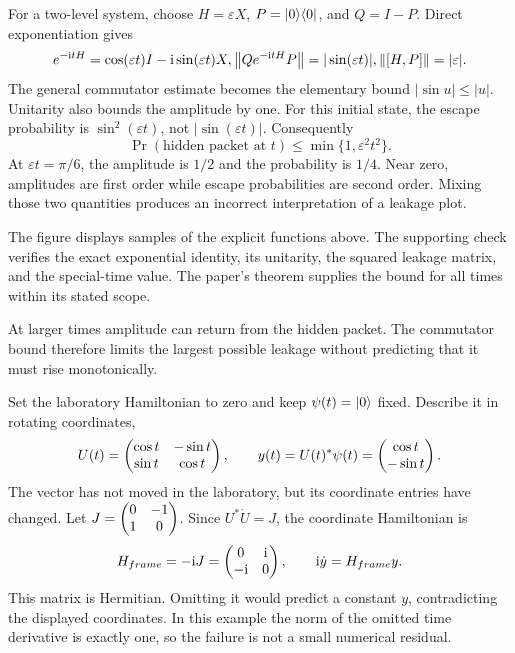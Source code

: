 For a two-level system, choose $H=\varepsilon X$, $P=\lvert 0\rangle\langle 0\rvert$, and $Q=I-P$. Direct exponentiation gives
\[
e^{-\ii tH}=\cos(\varepsilon t)I-\ii\sin(\varepsilon t)X,
\quad
\norm{Qe^{-\ii tH}P}=|\sin(\varepsilon t)|,
\quad\norm{[H,P]}=|\varepsilon|.
\]
The general commutator estimate becomes the elementary bound $|\sin u|\le |u|$. Unitarity also bounds the amplitude by one.
For this initial state, the escape probability is $\sin^2(\varepsilon t)$, not $|\sin(\varepsilon t)|$. Consequently
\[
\Pr(\text{hidden packet at }t)\le\min\{1,\varepsilon^2t^2\}.
\]
At $\varepsilon t=\pi/6$, the amplitude is $1/2$ and the probability is $1/4$. Near zero, amplitudes are first order while escape probabilities are second order. Mixing those two quantities produces an incorrect interpretation of a leakage plot.

The figure displays samples of the explicit functions above. The supporting check verifies the exact exponential identity, its unitarity, the squared leakage matrix, and the special-time value. The paper's theorem supplies the bound for all times within its stated scope.

At larger times amplitude can return from the hidden packet. The commutator bound therefore limits the largest possible leakage without predicting that it must rise monotonically.

Set the laboratory Hamiltonian to zero and keep $\psi(t)=\lvert 0\rangle$ fixed. Describe it in rotating coordinates,
\[
U(t)=\begin{pmatrix}\cos t&-\sin t\\\sin t&\cos t\end{pmatrix},
\qquad y(t)=U(t)^*\psi(t)=\begin{pmatrix}\cos t\\-\sin t\end{pmatrix}.
\]
The vector has not moved in the laboratory, but its coordinate entries have changed.
Let $J=\begin{pmatrix}0&-1\\1&0\end{pmatrix}$. Since $U^*\dot U=J$, the coordinate Hamiltonian is
\[
H_{\rm frame}=-\ii J=\mat{0&\ii\\-\ii&0},
\qquad \ii\dot y=H_{\rm frame}y.
\]
This matrix is Hermitian. Omitting it would predict a constant $y$, contradicting the displayed coordinates. In this example the norm of the omitted time derivative is exactly one, so the failure is not a small numerical residual.

